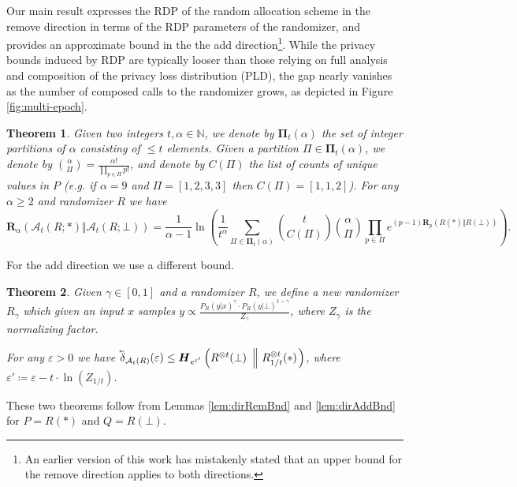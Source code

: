 \documentclass{article}
\newcommand{\Arxiv}[1]{}
\newcommand{\arxvFtnt}[1]{}
\newcommand{\Arxiv}[1]{#1}
\newcommand{\arxvFtnt}[1]{\footnote{#1}}
\theoremstyle{plain}
\newtheorem{theorem}{Theorem}[section]
\theoremstyle{definition}
\newcommand{\eps}{\varepsilon}
\newcommand{\naturals}{\mathbb{N}}
\newcommand{\lvec}[1]{\reflectbox{$\vec{\reflectbox{$#1$}}$}}
\newcommand{\out}{y}
\newcommand{\rand}{R}
\newcommand{\Renyi}[1]{\boldsymbol{R}_{#1}}
\newcommand{\RenyiDiv}[3]{\Renyi{#1}\left(#2 \Vert #3 \right)}
\newcommand{\HockeyStick}[1]{\boldsymbol{H}_{#1}}
\newcommand{\HockeyStickDiv}[3]{\HockeyStick{#1}\left(#2 ~\left\Vert~ #3 \right. \right)}
\newcommand{\alloc}[2]{\mathcal{A}_{#1}\left(#2\right)}
\newcommand{\allocFunc}[3]{\mathcal{A}_{#1}\left(#2; #3\right)}
\newcommand{\add}[1]{\lvec{#1}}
\newcommand{\privProfAdd}[1]{\add{\delta}_{#1}}
\begin{document}
Our main result expresses the RDP of the random allocation scheme in the remove direction in terms of the RDP parameters of the randomizer, and provides an approximate bound in the the add direction\footnote{An earlier version of this work has mistakenly stated that an upper bound for the remove direction applies to both directions.}. While the privacy bounds induced by RDP are typically looser than those relying on full analysis and composition of the privacy loss distribution (PLD), the gap nearly vanishes as the number of composed calls to the randomizer grows, as depicted in Figure \ref{fig:multi-epoch}.

\begin{theorem}\Arxiv{[Direct remove bound]}\label{thm:dirRemBnd}
    Given two integers $t, \alpha \in \naturals$, we denote by $\boldsymbol{\Pi}_{t}(\alpha)$ the set of integer partitions of $\alpha$ consisting of $\le t$ elements.\arxvFtnt{If $t \ge \alpha$, $\boldsymbol{\Pi}_{t}(\alpha) = \boldsymbol{\Pi}(\alpha)$ is simply the set of all integer partitions.} Given a partition $\Pi \in \boldsymbol{\Pi}_{t}(\alpha)$, we denote by $\binom{\alpha}{\Pi} = \frac{\alpha!}{\prod_{p \in \Pi} p!}$, and denote by $C(\Pi)$  the list of counts of unique values in $P$ (e.g. if $\alpha = 9$ and $\Pi = [1, 2, 3, 3]$ then $C(\Pi) = [1, 1, 2]$).
        For any $\alpha \ge 2$ and randomizer $\rand$ we have\arxvFtnt{The first version of this work stated an incorrect combinatorial coefficient in this expression. The numerical comparisons were based on the correct expression.}
    \[
        \RenyiDiv{\alpha}{\allocFunc{t}{\rand}{*}}{\allocFunc{t}{\rand}{\bot}} = \frac{1}{\alpha - 1} \ln \left( \frac{1}{t^{\alpha}} \sum_{\Pi \in \boldsymbol{\Pi}_{t}(\alpha)} \binom{t}{C(\Pi)} \binom{\alpha}{\Pi} \prod_{p \in \Pi} e^{(p-1)\RenyiDiv{p}{\rand(*)}{\rand(\bot)}}\right).
    \]
\end{theorem}
For the add direction we use a different bound.
\begin{theorem}\Arxiv{[Direct add bound]}\label{thm:dirAddBnd}
    Given $\gamma \in [0,1]$ and a randomizer $\rand$, we define a new randomizer $\rand_{\gamma}$ which given an input $x$ samples $\out \propto \frac{P_{\rand}(\out \vert x)^{\gamma} \cdot P_{\rand}(\out \vert \bot)^{1-\gamma}}{Z_{\gamma}}$, where $Z_{\gamma}$ is the normalizing factor.
    
    For any $\eps > 0$ we have $\privProfAdd{\alloc{t}{\rand}}(\eps) \le \HockeyStickDiv{e^{\eps'}}{\rand^{\otimes t}(\bot)}{\rand^{\otimes t}_{1/t}(*)}$, where $\eps' \coloneqq \eps -t \cdot \ln(Z_{1/t})$.
\end{theorem}
These two theorems follow from Lemmas \ref{lem:dirRemBnd} and \ref{lem:dirAddBnd} for $P = \rand(*)$ and $Q = \rand(\bot)$.
\end{document}
